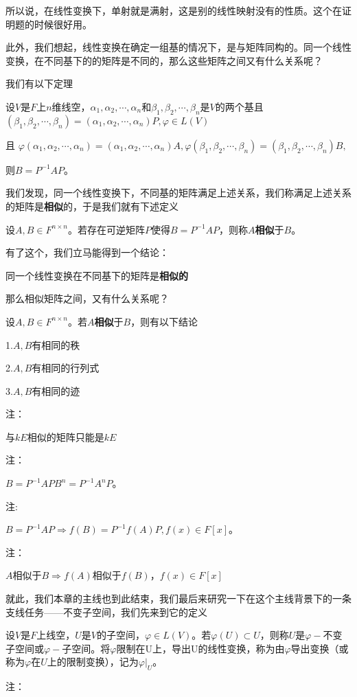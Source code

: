 \documentclass[lang=cn,10pt]{elegantbook}
\begin{document}
	所以说，在线性变换下，单射就是满射，这是别的线性映射没有的性质。这个在证明题的时候很好用。
	
	此外，我们想起，线性变换在确定一组基的情况下，是与矩阵同构的。同一个线性变换，在不同基下的的矩阵是不同的，那么这些矩阵之间又有什么关系呢？
	
	我们有以下定理
	\begin{theorem}
		设$V$是$F$上$n$维线空，$\alpha_1,\alpha_2,\cdots,\alpha_n$和$\beta_1,\beta_2,\cdots,\beta_n$是$V$的两个基且$(\beta_1,\beta_2,\cdots,\beta_n)=(\alpha_1,\alpha_2,\cdots,\alpha_n)P,\varphi\in L(V)$
		
		且
		$\varphi(\alpha_1,\alpha_2,\cdots,\alpha_n)=(\alpha_1,\alpha_2,\cdots,\alpha_n)A,\varphi(\beta_1,\beta_2,\cdots,\beta_n)=(\beta_1,\beta_2,\cdots,\beta_n)B,$
		
		则$B=P^{-1}AP$。
	\end{theorem}
	我们发现，同一个线性变换下，不同基的矩阵满足上述关系，我们称满足上述关系的矩阵是\textbf{相似}的，于是我们就有下述定义
	\begin{definition}[相似]
		设$A,B\in F^{n\times n}$。若存在可逆矩阵$P$使得$B=P^{-1}AP$，则称$A$\textbf{相似}于$B$。
	\end{definition}
	有了这个，我们立马能得到一个结论：
	
	同一个线性变换在不同基下的矩阵是\textbf{相似的}
	
	那么相似矩阵之间，又有什么关系呢？
	
	\begin{conclusion}
		设$A,B\in F^{n\times n}$。若$A$\textbf{相似}于$B$，则有以下结论
		
		1.$A,B$有相同的秩
		
		2.$A,B$有相同的行列式
		
		3.$A,B$有相同的迹
	\end{conclusion}
	注：
	
	与$kE$相似的矩阵只能是$kE$
	
	注：
	
	$B=P^{-1}AP  B^n=P^{-1}A^nP$。
	
	注:
	
	$B=P^{-1}AP\Rightarrow f(B)=P^{-1}f(A)P,f(x)\in F[x]$。
	
	注：
	
	$A$相似于$B\Rightarrow f(A)$相似于$f(B)$，$f(x)\in F[x]$
	
	就此，我们本章的主线也到此结束，我们最后来研究一下在这个主线背景下的一条支线任务——不变子空间，我们先来到它的定义
	
	\begin{definition}[不变子空间]
		设$V$是$F$上线空，$U$是$V$的子空间，$\varphi\in L(V)$。若$\varphi(U)\subset U$，则称$U$是$\varphi-$不变子空间或$\varphi-$子空间。将$\varphi$限制在U上，导出U的线性变换，称为由$\varphi$导出变换（或称为$\varphi$在$U$上的限制变换），记为$\varphi|_U$。
	\end{definition}
	注：
	
\end{document}
